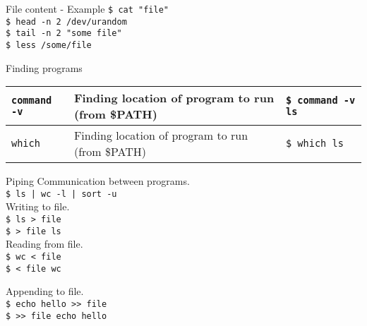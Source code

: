 \documentclass{beamer}
\let\tt\texttt
\begin{document}
\begin{frame}{File content - Example}
        \tt{\$ cat "file"}         \\
        \tt{\$ head -n 2 /dev/urandom}   \\
        \tt{\$ tail -n 2 "some file"}        \\
        \tt{\$ less /some/file}                 \\
\end{frame}

\begin{frame}{Finding programs}
        \begin{tabular}{p{} p{} | p{}}
                \hline
                \tt{command -v}             &
                Finding location of program to run (from \$PATH) &
                \tt{\$ command -v ls}       \\
                \hline
                \tt{which}             &
                Finding location of program to run (from \$PATH) &
                \tt{\$ which ls}       \\
                \hline
        \end{tabular}
\end{frame}

\begin{frame}{Piping}
        Communication between programs.     \\
        \tt{\$ ls | wc -l | sort -u}        \\

        Writing to file.    \\
        \tt{\$ ls > file}   \\
        \tt{\$ > file ls}   \\

        Reading from file.    \\
        \tt{\$ wc < file}   \\
        \tt{\$ < file wc}
        
        Appending to file.    \\
        \tt{\$ echo hello >> file}   \\
        \tt{\$ >> file echo hello }
\end{frame}
\end{document}
